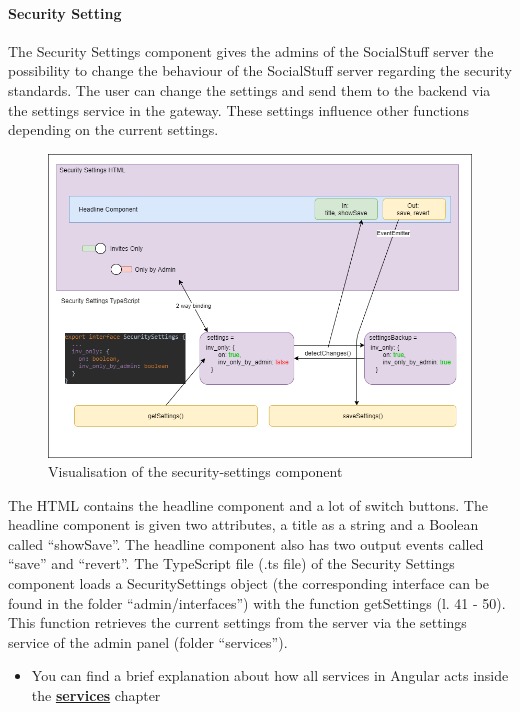 \paragraph{Security Setting}
The Security Settings component gives the admins of the SocialStuff server the possibility to change the behaviour of the SocialStuff server
regarding the security standards. The user can change the settings and send them to the backend via the settings service in the gateway.
These settings influence other functions depending on the current settings.
\begin{figure}[h]
    \centering
    \includegraphics[width=1.0\textwidth]{./images/security_settings}
    \caption{Visualisation of the security-settings component}
    \label{fig:secset}
\end{figure}
The HTML contains the headline component and a lot of switch buttons. The headline component is given two attributes,
a title as a string and a Boolean called \enquote{showSave}. The headline component also has two output events called \enquote{save} and \enquote{revert}.
The TypeScript file (.ts file) of the Security Settings component loads a SecuritySettings object (the corresponding interface can be found in the folder \enquote{admin/interfaces}) with the function getSettings (l. 41 - 50).
This function retrieves the current settings from the server via the settings service of the admin panel (folder \enquote{services}).
\begin{itemize}
    \item You can find a brief explanation about how all services in Angular acts inside the \hyperref[subsec:services]{\textbf{services}} chapter
\end{itemize}
